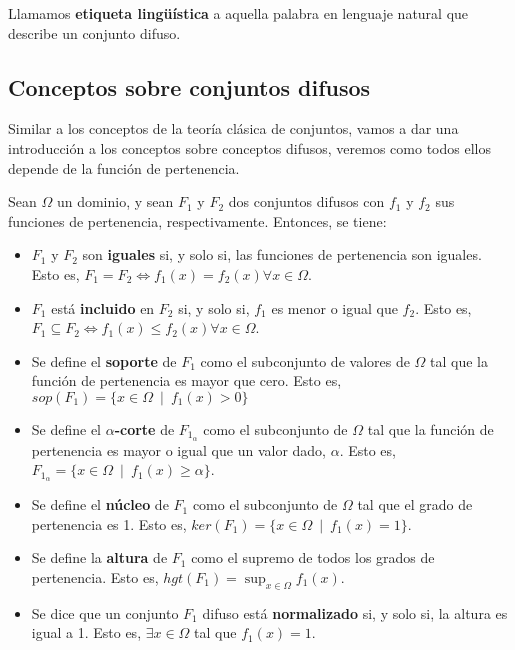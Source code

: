 \begin{definition}
Llamamos \textbf{etiqueta lingüística} a aquella palabra en lenguaje natural que describe un conjunto difuso.
\end{definition}

\subsection{Conceptos sobre conjuntos difusos}

Similar a los conceptos de la teoría clásica de conjuntos, vamos a dar una introducción a los conceptos sobre conceptos difusos, veremos como todos ellos depende de la función de pertenencia.

Sean $\Omega$ un dominio, y sean $F_1$ y $F_2$ dos conjuntos difusos con $f_1$ y $f_2$ sus funciones de pertenencia, respectivamente. Entonces, se tiene:

\begin{itemize}
    \item $F_1$ y $F_2$ son \textbf{iguales} si, y solo si, las funciones de pertenencia son iguales. Esto es, $F_1 = F_2 \Leftrightarrow f_1(x) = f_2(x) \forall x \in \Omega$.
    \item $F_1$ está \textbf{incluido} en $F_2$ si, y solo si, $f_1$ es menor o igual que $f_2$. Esto es, $F_1 \subseteq F_2 \Leftrightarrow f_1(x) \leq f_2(x) \forall x \in \Omega$.
    \item Se define el \textbf{soporte} de $F_1$ como el subconjunto de valores de $\Omega$ tal que la función de pertenencia es mayor que cero. Esto es, $sop(F_1) = \{ x \in \Omega \enspace | \enspace f_1(x) > 0 \}$
    \item Se define el \textbf{$\alpha$-corte} de $F_{1_\alpha}$ como el subconjunto de $\Omega$ tal que la función de pertenencia es mayor o igual que un valor dado, $\alpha$. Esto es, $F_{1_\alpha} = \{ x \in \Omega \enspace | \enspace f_1(x) \geq \alpha \}$.
    \item Se define el \textbf{núcleo} de $F_1$ como el subconjunto de $\Omega$ tal que el grado de pertenencia es 1. Esto es, $ker(F_1) = \{ x\in \Omega \enspace | \enspace f_1(x) = 1 \}$.
    \item Se define la \textbf{altura} de $F_1$ como el supremo de todos los grados de pertenencia. Esto es, $hgt(F_1) = \sup_{x\in \Omega} f_1(x)$.
    \item Se dice que un conjunto $F_1$ difuso está \textbf{normalizado} si, y solo si, la altura es igual a 1. Esto es, $\exists x \in \Omega$ tal que $f_1(x) = 1$.
\end{itemize}

